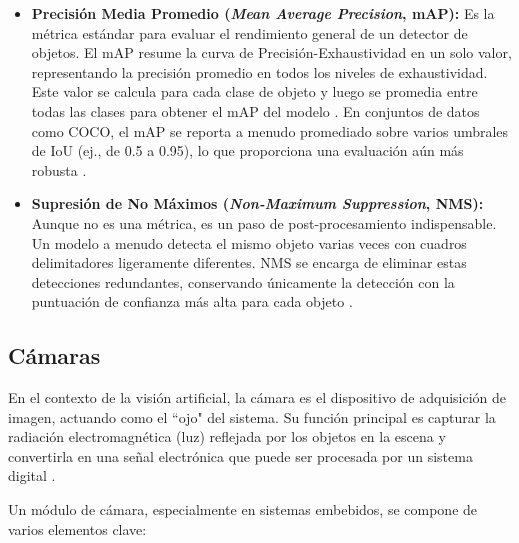 \begin{itemize}
    \item \textbf{Precisión Media Promedio (\textit{Mean Average Precision}, mAP):} Es la métrica estándar para evaluar el rendimiento general de un detector de objetos. El mAP resume la curva de Precisión-Exhaustividad en un solo valor, representando la precisión promedio en todos los niveles de exhaustividad. Este valor se calcula para cada clase de objeto y luego se promedia entre todas las clases para obtener el mAP del modelo \cite{sapkota2025yolo}. En conjuntos de datos como COCO, el mAP se reporta a menudo promediado sobre varios umbrales de IoU (ej., de 0.5 a 0.95), lo que proporciona una evaluación aún más robusta \cite{terven2023yolo}.

    \item \textbf{Supresión de No Máximos (\textit{Non-Maximum Suppression}, NMS):} Aunque no es una métrica, es un paso de post-procesamiento indispensable. Un modelo a menudo detecta el mismo objeto varias veces con cuadros delimitadores ligeramente diferentes. NMS se encarga de eliminar estas detecciones redundantes, conservando únicamente la detección con la puntuación de confianza más alta para cada objeto \cite{sapkota2025yolo}.
\end{itemize}














\subsection{Cámaras}
\label{subsec:camaras}

En el contexto de la visión artificial, la cámara es el dispositivo de adquisición de imagen, actuando como el ``ojo" del sistema. Su función principal es capturar la radiación electromagnética (luz) reflejada por los objetos en la escena y convertirla en una señal electrónica que puede ser procesada por un sistema digital \cite{szeliski2010computer}.

Un módulo de cámara, especialmente en sistemas embebidos, se compone de varios elementos clave:

